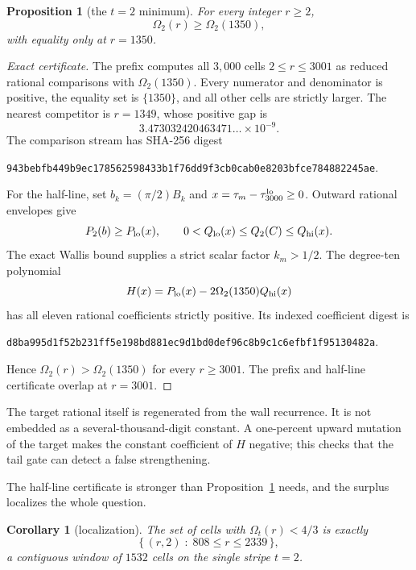 \documentclass[11pt,a4paper]{article}
\theoremstyle{plain}
\newtheorem{proposition}[theorem]{Proposition}
\newtheorem{corollary}[theorem]{Corollary}
\theoremstyle{remark}
\begin{document}
\begin{proposition}[the $t=2$ minimum]\label{prop:t2}
For every integer $r\ge2$,
\[
 \Omega_2(r)\ge\Omega_2(1350),
\]
with equality only at $r=1350$.
\end{proposition}

\begin{proof}[Exact certificate]
The prefix computes all $3{,}000$ cells $2\le r\le3001$ as reduced rational
comparisons with $\Omega_2(1350)$.  Every numerator and denominator is
positive, the equality set is $\{1350\}$, and all other cells are strictly
larger.  The nearest competitor is $r=1349$, whose positive gap is
\[
 3.473032420463471\ldots\times10^{-9}.
\]
The comparison stream has SHA-256 digest
\begin{center}
\texttt{943bebfb449b9ec178562598433b1f76dd9f3cb0cab0e8203bfce784882245ae}.
\end{center}

For the half-line, set $b_k=(\pi/2)B_k$ and
$x=\tau_m-\tau_{3000}^{\rm lo}\ge0$.  Outward rational envelopes give
\[
 P_2(b)\ge P_{\rm lo}(x),
 \qquad
 0<Q_{\rm lo}(x)\le Q_2(C)\le Q_{\rm hi}(x).
\]
The exact Wallis bound supplies a strict scalar factor $k_m>1/2$.  The
degree-ten polynomial
\[
 H(x)=P_{\rm lo}(x)-2\Omega_2(1350)Q_{\rm hi}(x)
\]
has all eleven rational coefficients strictly positive.  Its indexed
coefficient digest is
\begin{center}
\texttt{d8ba995d1f52b231ff5e198bd881ec9d1bd0def96c8b9c1c6efbf1f95130482a}.
\end{center}
Hence $\Omega_2(r)>\Omega_2(1350)$ for every $r\ge3001$.  The prefix and
half-line certificate overlap at $r=3001$.
\end{proof}

The target rational itself is regenerated from the wall recurrence.  It is
not embedded as a several-thousand-digit constant.  A one-percent upward
mutation of the target makes the constant coefficient of $H$ negative; this
checks that the tail gate can detect a false strengthening.

The half-line certificate is stronger than Proposition~\ref{prop:t2} needs,
and the surplus localizes the whole question.

\begin{corollary}[localization]\label{cor:localize}
The set of cells with $\Omega_t(r)<4/3$ is exactly
\[
 \bigl\{\,(r,2)\;:\;808\le r\le2339\,\bigr\},
\]
a contiguous window of $1532$ cells on the single stripe $t=2$.
\end{corollary}
\end{document}
